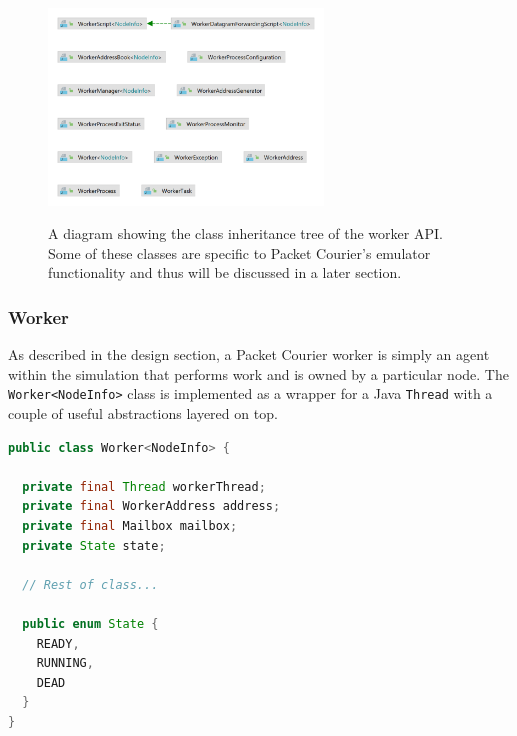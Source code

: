 \begin{figure}[!h]
    \includegraphics[width=0.65\textwidth]{images/chapter_4_implementation/worker_api_tree}
    \centering~\caption{A diagram showing the class inheritance tree of the worker API. Some of these classes are
    specific to Packet Courier's emulator functionality and thus will be discussed in a later section.}
    \label{fig:chapter_4_implementation-worker_api_tree}
\end{figure}

\subsubsection{Worker}

As described in the design section, a Packet Courier worker is simply an agent within the simulation that performs
work and is owned by a particular node. The \texttt{Worker<NodeInfo>} class is implemented as a wrapper for a Java
\texttt{Thread}\cite{java_Thread} with a couple of useful abstractions layered on top.
\begin{lstlisting}[language=Java,caption={A cut-down version of the \texttt{Worker<NodeInfo>} class.},
    label={code:worker_class},captionpos=b]
public class Worker<NodeInfo> {

  private final Thread workerThread;
  private final WorkerAddress address;
  private final Mailbox mailbox;
  private State state;

  // Rest of class...

  public enum State {
    READY,
    RUNNING,
    DEAD
  }
}
\end{lstlisting}

